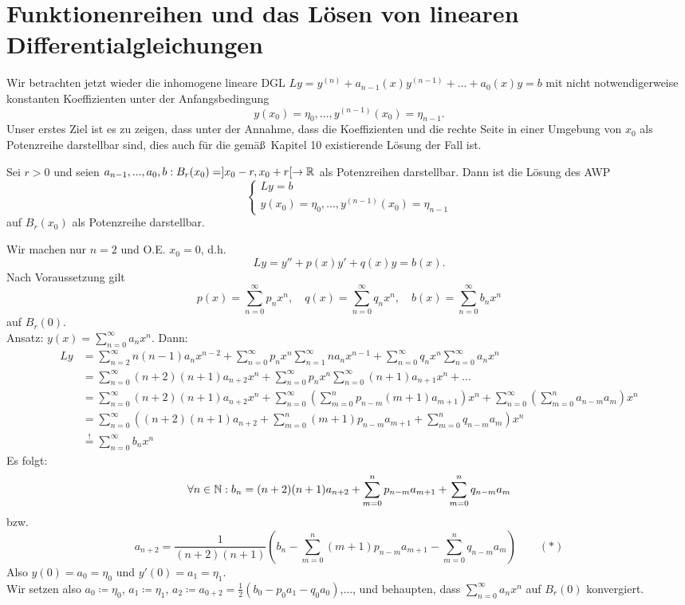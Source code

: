 \chapter{Funktionenreihen und das L\"osen von linearen Differentialgleichungen}
Wir betrachten jetzt wieder die inhomogene lineare DGL $ Ly=y^{(n)}+a_{n-1}(x)y^{(n-1)}+...+a_0(x)y=b $ mit nicht notwendigerweise konstanten Koeffizienten unter der Anfangsbedingung
\[ y(x_0)=\eta_0,...,y^{(n-1)}(x_0)=\eta_{n-1} .\]
Unser erstes Ziel ist es zu zeigen, dass unter der Annahme, dass die Koeffizienten und die rechte Seite in einer Umgebung von $ x_0 $ als Potenzreihe darstellbar sind, dies auch f\"ur die gem\"a\ss\ Kapitel 10 existierende L\"osung der Fall ist.
\begin{satz}
	Sei $ r>0 $ und seien $ a_{n-1},...,a_0,b: B_r(x_0)=]x_0-r,x_0+r[\rightarrow\mathbb{R} $ als Potenzreihen darstellbar. Dann ist die L\"osung des AWP
	\[ \begin{cases}
	Ly=b\\
	y(x_0)=\eta_0,...,y^{(n-1)}(x_0)=\eta_{n-1}
	\end{cases} \]
	auf $ B_r(x_0) $ als Potenzreihe darstellbar.
\end{satz}
\begin{beweis}
	Wir machen nur $ n=2 $ und O.E. $ x_0=0 $, d.h.
	\[ Ly=y''+p(x)y'+q(x)y=b(x). \]
	Nach Voraussetzung gilt
	\[ p(x)=\sum_{n=0}^{\infty}p_n x^n,\quad q(x)=\sum_{n=0}^{\infty}q_n x^n,\quad b(x)=\sum_{n=0}^{\infty}b_nx^n \]
	auf $ B_r(0) $.\\
	Ansatz: $ y(x)=\sum_{n=0}^{\infty}a_nx^n $. Dann:
	\begin{align*} Ly&=\sum_{n=2}^{\infty}n(n-1)a_n x^{n-2}+\sum_{n=0}^{\infty}p_n x^n\sum_{n=1}^{\infty}na_n x^{n-1}+\sum_{n=0}^{\infty}q_n x^n\sum_{n=0}^{\infty}a_n x^n\\
	&=\sum_{n=0}^{\infty}(n+2)(n+1)a_{n+2}x^n+\sum_{n=0}^{\infty}p_n x^n\sum_{n=0}^{\infty}(n+1)a_{n+1}x^n+...\\
	&=\sum_{n=0}^{\infty}(n+2)(n+1)a_{n+2}x^n+\sum_{n=0}^{\infty}\left(\sum_{m=0}^{n}p_{n-m}(m+1)a_{m+1}\right)x^n+\sum_{n=0}^{\infty}\left(\sum_{m=0}^{n}a_{n-m}a_m\right)x^n\\
	&=\sum_{n=0}^{\infty}\left((n+2)(n+1)a_{n+2}+\sum_{m=0}^{n}(m+1)p_{n-m}a_{m+1}+\sum_{m=0}^{n}q_{n-m}a_m\right)x^n\\&\overset{!}{=}\sum_{n=0}^{\infty}b_nx^n \end{align*}
	Es folgt:
	\[ \forall n\in\mathbb{N}: b_n=(n+2)(n+1)a_{n+2}+\sum_{m=0}^{n}p_{n-m}a_{m+1}+\sum_{m=0}^{n}q_{n-m}a_m \]
	bzw.
	\[ a_{n+2}=\frac{1}{(n+2)(n+1)}\left(b_n-\sum_{m=0}^{n}(m+1)p_{n-m}a_{m+1}-\sum_{m=0}^{n}q_{n-m}a_m\right)\qquad(\ast) \]
	Also $ y(0)=a_0=\eta_0 $ und $ y'(0)=a_1=\eta_1 $.\\
	Wir setzen also $ a_0\coloneqq\eta_0 $, $ a_1\coloneqq\eta_1 $, $ a_2\coloneqq a_{0+2}=\frac{1}{2}(b_0-p_0 a_1-q_0a_0) $,..., und behaupten, dass $ \sum_{n=0}^{\infty}a_n x^n $ auf $ B_r(0) $ konvergiert.
\end{beweis}